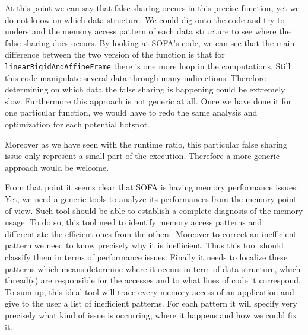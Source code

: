 At this point we can say that false sharing occurs in this precise function, yet we do not know on which data structure.
We could dig onto the code and try to understand the memory access pattern of each data structure to see where the false sharing does occurs.
By looking at \gls{SOFA}'s code, we can see that the main difference between the two version of the function is that for \texttt{linearRigidAndAffineFrame} there is one more loop in the computations.
Still this code manipulate several data through many indirections.
Therefore determining on which data the false sharing is happening could be extremely slow.
Furthermore this approach is not generic at all.
Once we have done it for one particular function, we would have to redo the same analysis and optimization for each potential hotspot.

Moreover as we have seen with the runtime ratio, this particular false sharing issue only represent a small part of the execution.
Therefore a more generic approach would be welcome.

From that point it seems clear that \gls{SOFA} is having memory performance issues.
Yet, we need a generic tools to analyze its performances from the memory point of view.
Such tool should be able to establish a complete diagnosis of the memory usage.
To do so, this tool need to identify memory access patterns and differentiate the efficient ones from the others.
Moreover to correct an inefficient pattern we need to know precisely why it is inefficient.
Thus this tool should classify them in terms of performance issues.
Finally it needs to localize these patterns which means determine where it occurs in term of data structure, which thread(s) are responsible for the accesses and to what lines of code it correspond.
To sum up, this ideal tool will trace every memory access of an application and give to the user a list of inefficient patterns.
For each pattern it will specify very precisely what kind of issue is occurring, where it happens and how we could fix it.


